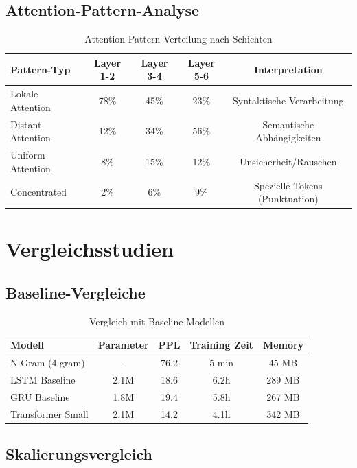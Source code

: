 \subsection{Attention-Pattern-Analyse}

\begin{table}[h]
\centering
\begin{tabular}{|l|c|c|c|c|}
\hline
\textbf{Pattern-Typ} & \textbf{Layer 1-2} & \textbf{Layer 3-4} & \textbf{Layer 5-6} & \textbf{Interpretation} \\
\hline
Lokale Attention & 78\% & 45\% & 23\% & Syntaktische Verarbeitung \\
Distant Attention & 12\% & 34\% & 56\% & Semantische Abhängigkeiten \\
Uniform Attention & 8\% & 15\% & 12\% & Unsicherheit/Rauschen \\
Concentrated & 2\% & 6\% & 9\% & Spezielle Tokens (Punktuation) \\
\hline
\end{tabular}
\caption{Attention-Pattern-Verteilung nach Schichten}
\label{tab:attention_patterns}
\end{table}

\section{Vergleichsstudien}

\subsection{Baseline-Vergleiche}

\begin{table}[h]
\centering
\begin{tabular}{|l|c|c|c|c|}
\hline
\textbf{Modell} & \textbf{Parameter} & \textbf{PPL} & \textbf{Training Zeit} & \textbf{Memory} \\
\hline
N-Gram (4-gram) & - & 76.2 & 5 min & 45 MB \\
LSTM Baseline & 2.1M & 18.6 & 6.2h & 289 MB \\
GRU Baseline & 1.8M & 19.4 & 5.8h & 267 MB \\
Transformer Small & 2.1M & 14.2 & 4.1h & 342 MB \\
\hline
\end{tabular}
\caption{Vergleich mit Baseline-Modellen}
\label{tab:baseline_comparison}
\end{table}

\subsection{Skalierungsvergleich}

